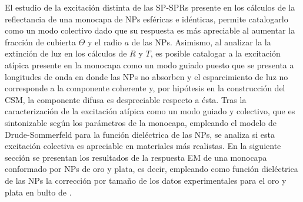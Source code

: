 El estudio de la excitación distinta de las SP-SPRs presente en los cálculos de la reflectancia de una monocapa de NPs esféricas e idénticas, permite catalogarlo como un modo colectivo dado que su respuesta es más apreciable al aumentar la fracción de cubierta $\Theta$ y el radio $a$ de las NPs. Asimismo, al analizar la la extinción de luz  en los cálculos de $R$ y $T$, es posible catalogar a la excitación atípica presente en la monocapa como un modo guiado puesto que se presenta a longitudes de onda en donde las NPs no absorben y el esparcimiento de luz no corresponde a la componente coherente y, por hipótesis en la construcción del CSM, la componente difusa es despreciable respecto a ésta. Tras la caracterización de la excitación atípica como un modo guiado y colectivo, que es sintonizable según los parámetros de la monocapa, empleando el modelo de Drude-Sommerfeld para la función dieléctrica de las NPs, se analiza si esta excitación colectiva es apreciable en materiales más realistas. En la siguiente sección se presentan los resultados de la respuesta EM de una monocapa conformado por NPs de oro y plata, es decir, empleando como función dieléctrica de las NPs la corrección por tamaño de los datos experimentales para el oro y plata en bulto de \cite{johnson1972constants}.

